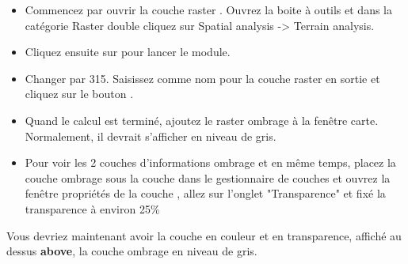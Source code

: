\begin{itemize}[label=--]
\item Commencez par ouvrir la couche raster . Ouvrez la boite à outils \grass et dans la catégorie Raster double cliquez sur Spatial
analysis -> Terrain analysis.
\item Cliquez ensuite sur  pour lancer le module.
\item Changer  par 315. Saisissez  comme nom pour la couche raster en sortie  et cliquez sur le bouton .
\item Quand le calcul est terminé, ajoutez le raster ombrage à la fenêtre carte. Normalement, il devrait s'afficher en niveau de gris.
\item Pour voir les 2 couches d'informations ombrage et  en même temps, placez la couche ombrage sous la couche  dans le gestionnaire de couches et ouvrez la fenêtre propriétés de la couche , allez sur l'onglet "Transparence" et fixé la transparence à environ 25\%
\end{itemize}

Vous devriez maintenant avoir la couche  en couleur et en transparence, affiché au dessus \textbf{above}, la couche ombrage en niveau de gris.

